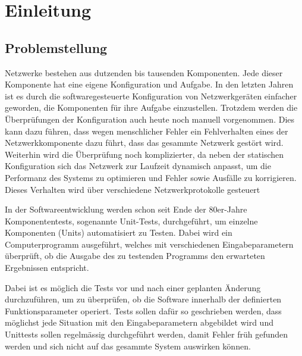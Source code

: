 \documentclass[]{subfiles}
\begin{document}
    \section{Einleitung}
    \subsection{Problemstellung}
    Netzwerke bestehen aus dutzenden bis tausenden Komponenten. 
    Jede dieser Komponente hat eine eigene Konfiguration und Aufgabe.
    In den letzten Jahren ist es durch die softwaregesteuerte Konfiguration
    von Netzwerkgeräten einfacher geworden, die Komponenten für ihre
    Aufgabe einzustellen. Trotzdem werden die Überprüfungen der Konfiguration 
    auch heute noch manuell vorgenommen. Dies kann dazu führen, dass wegen menschlicher
    Fehler ein Fehlverhalten eines der Netzwerkkomponente dazu führt,
    dass das gesammte Netzwerk gestört wird. 
    Weiterhin wird die Überprüfung noch komplizierter, da neben der statischen 
    Konfiguration sich das Netzwerk zur Laufzeit dynamisch anpasst, 
    um die Performanz des Systems zu optimieren und Fehler sowie Ausfälle
    zu korrigieren. 
    Dieses Verhalten wird über verschiedene Netzwerkprotokolle gesteuert
    
    In der Softwareentwicklung werden schon seit 
    Ende der 80er-Jahre Komponententests, sogenannte Unit-Tests, durchgeführt, um einzelne 
    Komponenten (Units) automatisiert zu Testen. Dabei wird ein Computerprogramm ausgeführt,
    welches mit verschiedenen Eingabeparametern überprüft, ob die Ausgabe des zu testenden
    Programms den erwarteten Ergebnissen entspricht.

    Dabei ist es möglich die Tests vor und nach einer geplanten Änderung durchzuführen,
    um zu überprüfen, ob die Software innerhalb der definierten Funktionsparameter operiert.
    Tests sollen dafür so geschrieben werden, dass möglichst jede Situation mit den 
    Eingabeparametern abgebildet wird und Unittests sollen regelmässig durchgeführt werden,
    damit Fehler früh gefunden werden und sich nicht auf das gesammte System auswirken können.

    \newpage
    
\end{document}

